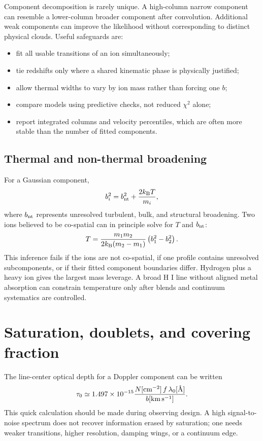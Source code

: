 Component decomposition is rarely unique. A high-column narrow component can
resemble a lower-column broader component after convolution. Additional weak
components can improve the likelihood without corresponding to distinct
physical clouds. Useful safeguards are:
\begin{itemize}
  \item fit all usable transitions of an ion simultaneously;
  \item tie redshifts only where a shared kinematic phase is physically
  justified;
  \item allow thermal widths to vary by ion mass rather than forcing one $b$;
  \item compare models using predictive checks, not reduced $\chi^2$ alone;
  \item report integrated columns and velocity percentiles, which are often
  more stable than the number of fitted components.
\end{itemize}

\subsection{Thermal and non-thermal broadening}

For a Gaussian component,
\begin{equation}
 b_i^2=b_{\rm nt}^2+\frac{2k_{\rm B}T}{m_i},
 \label{eq:b-decomposition}
\end{equation}
where $b_{\rm nt}$ represents unresolved turbulent, bulk, and structural
broadening. Two ions believed to be co-spatial can in principle solve for
$T$ and $b_{\rm nt}$:
\begin{equation}
 T=\frac{m_1m_2}{2k_{\rm B}(m_2-m_1)}
   \left(b_1^2-b_2^2\right).
 \label{eq:abs-two-ion-temperature}
\end{equation}
This inference fails if the ions are not co-spatial, if one profile contains
unresolved subcomponents, or if their fitted component boundaries differ.
Hydrogen plus a heavy ion gives the largest mass leverage. A broad H I line
without aligned metal absorption can constrain temperature only after blends
and continuum systematics are controlled.

\section{Saturation, doublets, and covering fraction}

The line-center optical depth for a Doppler component can be written
\begin{equation}
 \tau_0 \simeq 1.497\times10^{-15}
 \frac{N[{\rm cm^{-2}}]\,f\,\lambda_0[\text{\AA}]}
      {b[{\rm km\,s^{-1}}]}.
 \label{eq:tau-zero}
\end{equation}
This quick calculation should be made during observing design. A high
signal-to-noise spectrum does not recover information erased by saturation;
one needs weaker transitions, higher resolution, damping wings, or a
continuum edge.

